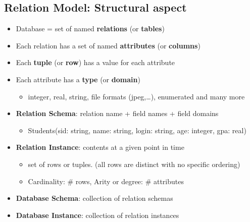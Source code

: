 \documentclass[11pt]{article}
\begin{document}
\subsection{Relation Model: Structural aspect}
\label{sec:org2eb9d44}
\begin{itemize}
\item Database = set of named \textbf{relations} (or \textbf{tables})
\item Each relation has a set of named \textbf{attributes} (or \textbf{columns})
\item Each \textbf{tuple} (or \textbf{row}) has a value for each attribute
\item Each attribute has a \textbf{type} (or \textbf{domain})
\begin{itemize}
\item integer, real, string, file formats (jpeg,\ldots{}), enumerated and many more
\end{itemize}
\item \textbf{Relation Schema}: relation name + field names + field domains
\begin{itemize}
\item Students(sid: string, name: string, login: string, age: integer, gpa: real)
\end{itemize}
\item \textbf{Relation Instance}: contents at a given point in time
\begin{itemize}
\item set of rows or tuples. (all rows are distinct with no specific ordering)
\item Cardinality: \# rows, Arity or degree: \# attributes
\end{itemize}
\item \textbf{Database Schema}: collection of relation schemas
\item \textbf{Database Instance}: collection of relation instances
\end{itemize}
\end{document}
